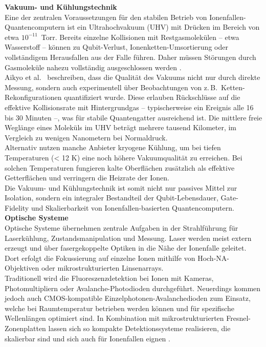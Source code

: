\textbf{Vakuum- und Kühlungstechnik} \\
Eine der zentralen Voraussetzungen für den stabilen Betrieb von Ionenfallen-Quantencomputern ist ein Ultrahochvakuum (UHV) mit Drücken im Bereich von etwa $10^{-11}$~Torr. Bereits einzelne Kollisionen mit Restgasmolekülen – etwa Wasserstoff – können zu Qubit-Verlust, Ionenketten-Umsortierung oder vollständigem Herausfallen aus der Falle führen. Daher müssen Störungen durch Gasmoleküle nahezu vollständig ausgeschlossen werden \cite{ionq2025}. \\
Aikyo et al.\ \cite{aikyo2020} beschreiben, dass die Qualität des Vakuums nicht nur durch direkte Messung, sondern auch experimentell über Beobachtungen von z.\,B.\ Ketten-Rekonfigurationen quantifiziert wurde. Diese erlauben Rückschlüsse auf die effektive Kollisionsrate mit Hintergrundgas – typischerweise ein Ereignis alle 16 bis 30 Minuten –, was für stabile Quantengatter ausreichend ist. Die mittlere freie Weglänge eines Moleküls im UHV beträgt mehrere tausend Kilometer, im Vergleich zu wenigen Nanometern bei Normaldruck. \\
Alternativ nutzen manche Anbieter kryogene Kühlung, um bei tiefen Temperaturen (< 12 K) eine noch höhere Vakuumqualität zu erreichen. Bei solchen Temperaturen fungieren kalte Oberflächen zusätzlich als effektive Getterflächen und verringern die Heizrate der Ionen. \\
Die Vakuum- und Kühlungstechnik ist somit nicht nur passives Mittel zur Isolation, sondern ein integraler Bestandteil der Qubit-Lebensdauer, Gate-Fidelity und Skalierbarkeit von Ionenfallen-basierten Quantencomputern. \\

\textbf{Optische Systeme} \\
Optische Systeme übernehmen zentrale Aufgaben in der Strahlführung für Laserkühlung, Zustandsmanipulation und Messung. Laser werden meist extern erzeugt und über fasergekoppelte Optiken in die Nähe der Ionenfalle geleitet. Dort erfolgt die Fokussierung auf einzelne Ionen mithilfe von Hoch-NA-Objektiven oder mikrostrukturierten Linsenarrays. \\
Traditionell wird die Fluoreszenzdetektion bei Ionen mit Kameras, Photomultipliern oder Avalanche-Photodioden durchgeführt. Neuerdings kommen jedoch auch CMOS-kompatible Einzelphotonen-Avalanchedioden zum Einsatz, welche bei Raumtemperatur betrieben werden können und für spezifische Wellenlängen optimiert sind. In Kombination mit mikrostrukturierten Fresnel-Zonenplatten lassen sich so kompakte Detektionssysteme realisieren, die skalierbar sind und sich auch für Ionenfallen eignen \cite{chatterjee2023}. \\

